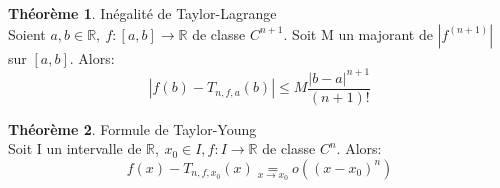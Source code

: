 \documentclass[fleqn]{article}
\theoremstyle{definition} \newtheorem*{defi}{D\'efinition}
\theoremstyle{definition} \newtheorem*{theo}{Th\'eor\`eme}
\theoremstyle{remark} \newtheorem*{rqs}{Remarques}
\theoremstyle{definition} \newtheorem*{prop}{Propri\'et\'e}
\begin{document}
\begin{theo} In\'egalit\'e de Taylor-Lagrange\\
	Soient $a,b \in \mathbb{R},\ f:[a,b] \rightarrow \mathbb{R}$ de classe $C^{n+1}$. Soit M un majorant de $|f^{(n+1)}|$ sur $[a,b]$. Alors:
	\[|f(b) - T_{n,f,a}(b)| \leq M\frac{|b-a|^{n+1}}{(n+1)!}\]
\end{theo}

\begin{theo} Formule de Taylor-Young\\
	Soit I un intervalle de $\mathbb{R},\ x_0 \in I, f:I\rightarrow \mathbb{R}$ de classe $C^n$. Alors:
	\[f(x) - T_{n,f,x_0}(x) \underset{x \rightarrow x_0}{=} o((x-x_0)^n)\]
\end{theo}
\end{document}
